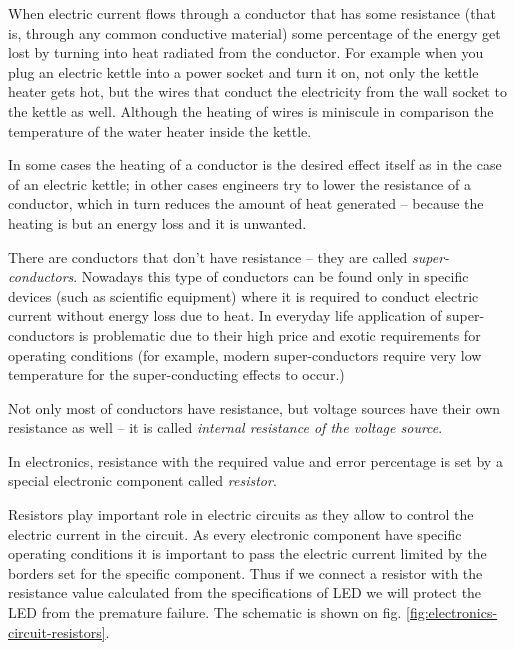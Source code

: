 \documentclass[../sparc.tex]{subfiles}
\begin{document}

When electric current flows through a conductor that has some resistance (that
is, through any common conductive material) some percentage of the energy get
lost by turning into heat radiated from the conductor.  For example when you
plug an electric kettle into a power socket and turn it on, not only the kettle
heater gets hot, but the wires that conduct the electricity from the wall socket
to the kettle as well.  Although the heating of wires is miniscule in comparison
the temperature of the water heater inside the kettle.

In some cases the heating of a conductor is the desired effect itself as in the
case of an electric kettle; in other cases engineers try to lower the resistance
of a conductor, which in turn reduces the amount of heat generated -- because
the heating is but an energy loss and it is unwanted.


There are conductors that don't have resistance -- they are called
\emph{super-conductors}.  Nowadays this type of conductors can be found only in
specific devices (such as scientific equipment) where it is required to conduct
electric current without energy loss due to heat.  In everyday life application
of super-conductors is problematic due to their high price and exotic
requirements for operating conditions (for example, modern super-conductors
require very low temperature for the super-conducting effects to occur.)

Not only most of conductors have resistance, but voltage sources have their own
resistance as well -- it is called \emph{internal resistance of the voltage
source}.

In electronics, resistance with the required value and error percentage is set
by a special electronic component called \emph{resistor}.

Resistors play important role in electric circuits as they allow to control the
electric current in the circuit.  As every electronic component have specific
operating conditions it is important to pass the electric current limited by the
borders set for the specific component.  Thus if we connect a resistor with the
resistance value calculated from the specifications of LED we will protect the
LED from the premature failure.  The schematic is shown on
fig. \ref{fig:electronics-circuit-resistors}.
\end{document}
